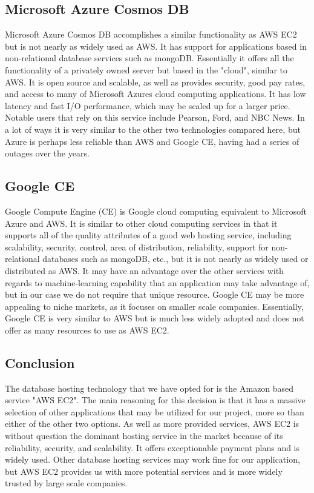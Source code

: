 \documentclass[onecolumn, draftclsnofoot,10pt, compsoc]{IEEEtran}
\begin{document}
	\subsection{Microsoft Azure Cosmos DB}
	
		Microsoft Azure Cosmos DB accomplishes a similar functionality as AWS EC2 but is not nearly as widely used as AWS. It has support for applications based in
		non-relational database services such as mongoDB. Essentially it offers all the functionality of a privately owned server but based in the "cloud", similar to AWS.
		It is open source and scalable, as well as provides security, good pay rates, and access to many of Microsoft Azures cloud computing applications. It has low latency and fast
		I/O performance, which may be scaled up for a larger price. Notable users that rely on this service include Pearson, Ford, and NBC News.  
		In a lot of ways it is very similar to the other two technologies compared here, but Azure is perhaps less reliable than AWS and Google CE, having had a series of outages over the years.
	
	\subsection{Google CE}
	
		Google Compute Engine (CE) is Google cloud computing equivalent to Microsoft Azure and AWS. It is similar to other cloud computing services in that it supports all of 
		the quality attributes of a good web hosting service, including scalability, security, control, area of distribution, reliability, support for non-relational databases
		such as mongoDB, etc., but it is not nearly as widely used or distributed as AWS. It may have an advantage over the other services with regards to machine-learning capability that an application
		may take advantage of, but in our case we do not require that unique resource. Google CE may be more appealing to niche markets, as it focuses on smaller scale companies.
		Essentially, Google CE is very similar to AWS but is much less widely adopted and does not offer as many resources to use as AWS EC2.
		
	\subsection{Conclusion}
	
		The database hosting technology that we have opted for is the Amazon based service "AWS EC2". The main reasoning for this decision is that it has a massive
		selection of other applications that may be utilized for our project, more so than either of the other two options. As well as more provided services, AWS EC2 is
		without question the dominant hosting service in the market because of its reliability, security, and scalability. It offers exceptionable payment plans and is
		widely used. Other database hosting services may work fine for our application, but AWS EC2 provides us with more potential services and is more widely trusted by large scale companies. 
	
\end{document}
